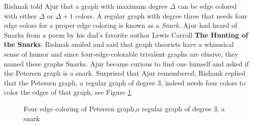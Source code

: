 Rishnak told Ajur that a graph with maximum degree $\Delta$ can be edge colored with either $\Delta$ or $\Delta+1$ colors. A regular graph with degree three that needs four edge colors for a proper edge coloring is known as a \emph{Snark}. Ajur had heard of Snarks from a poem by his dad's favorite author Lewis Carroll
\textbf{The Hunting of the Snarks}. Rishnak smiled and said that graph theorists have a whimsical sense of humor and since four-edge-colorable trivalent graphs are elusive, they named these graphs Snarks.
Ajur became curious to find one himself and asked if the Petersen graph is a snark. Surprised that Ajur remembered, Rishank replied that the Petersen graph, a regular graph of degree 3, indeed needs four colors to color the edges of that graph, see Figure \ref{10g7}
\begin{figure}
\begin{center}
\caption{ Four edge coloring of Petersen graph,a regular graph of degree 3, a snark }\label{10g7}
\end{center}
\end{figure}

